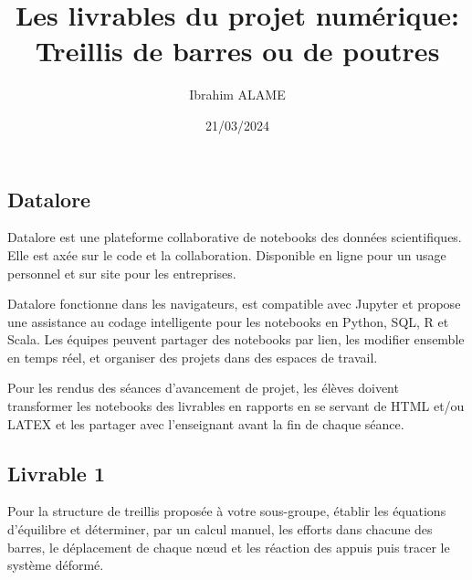 \documentclass[a4paper]{article}
\title{Les livrables du projet numérique: Treillis  de barres ou de poutres}
\author{Ibrahim ALAME}
\date{21/03/2024}
\begin{document}
\maketitle
 
 \newcommand{\appui}[3]%
{\fill[fill=gray]   (#1,#2) -- (#1-#3*0.8,#2+#3*0.5)--(#1-#3*0.8,#2-#3*0.5)--cycle;
\fill[fill=gray] [pattern=north east lines]
     (#1-#3*0.8,#2+#3*0.5)
     --(#1-#3*0.8,#2-#3*0.5)
     -- (#1-#3*0.8-#3*0.5,#2-#3*0.5)
     -- (#1-#3*0.8-#3*0.5,#2+#3*0.5)
     -- cycle;

}
\subsection*{Datalore}
Datalore est une plateforme collaborative de notebooks des données scientifiques. Elle est axée sur le code et la collaboration. Disponible en ligne pour un usage personnel et sur site pour les entreprises.

Datalore fonctionne dans les navigateurs, est compatible avec Jupyter et propose une assistance au codage intelligente pour les notebooks en Python, SQL, R et Scala. Les équipes peuvent partager des notebooks par lien, les modifier ensemble en temps réel, et organiser des projets dans des espaces de travail. 

Pour les rendus des séances d'avancement de projet, les élèves doivent transformer les notebooks des livrables en rapports en se servant de HTML et/ou LATEX et les partager avec l'enseignant avant la fin de chaque séance.
\subsection*{Livrable 1}
 Pour la structure de treillis proposée à votre sous-groupe, établir les équations d'équilibre et déterminer, par un calcul manuel, les efforts dans chacune des barres, le déplacement de chaque nœud et les réaction des appuis puis tracer le système déformé.
\end{document}
